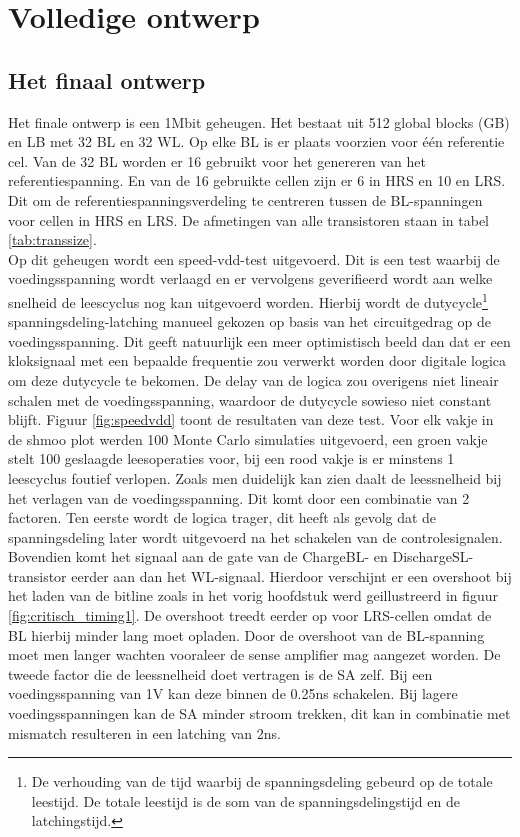 \chapter{Volledige ontwerp}
\label{final}
\section{Het finaal ontwerp}
Het finale ontwerp is een 1Mbit geheugen. Het bestaat uit 512 global blocks (GB) en LB met 32 BL en 32 WL. Op elke BL is er plaats voorzien voor één referentie cel. Van de 32 BL worden er 16 gebruikt voor het genereren van het referentiespanning. En van de 16 gebruikte cellen zijn er 6 in HRS en 10 en LRS. Dit om de referentiespanningsverdeling te centreren tussen de BL-spanningen voor cellen in HRS en LRS. De afmetingen van alle transistoren staan in tabel \ref{tab:transsize}. \\
Op dit geheugen wordt een speed-vdd-test uitgevoerd. Dit is een test waarbij de voedingsspanning wordt verlaagd en er vervolgens geverifieerd wordt aan welke snelheid de leescyclus nog kan uitgevoerd worden. Hierbij wordt de dutycycle\footnote{De verhouding van de tijd waarbij de spanningsdeling gebeurd op de totale leestijd. De totale leestijd is de som van de spanningsdelingstijd en de latchingstijd.} spanningsdeling-latching manueel gekozen op basis van het circuitgedrag op de voedingsspanning. Dit geeft natuurlijk een meer optimistisch beeld dan dat er een kloksignaal met een bepaalde frequentie zou verwerkt worden door digitale logica om deze dutycycle te bekomen. De delay van de logica zou overigens niet lineair schalen met de voedingsspanning, waardoor de dutycycle sowieso niet constant blijft. Figuur \ref{fig:speedvdd} toont de resultaten van deze test. Voor elk vakje in de shmoo plot werden 100 Monte Carlo simulaties uitgevoerd, een groen vakje stelt 100 geslaagde leesoperaties voor, bij een rood vakje is er minstens 1 leescyclus foutief verlopen. Zoals men duidelijk kan zien  daalt de leessnelheid bij het verlagen van de voedingsspanning. Dit komt door een combinatie van 2 factoren. Ten eerste wordt de logica trager, dit heeft als gevolg dat de spanningsdeling later wordt uitgevoerd na het schakelen van de controlesignalen. Bovendien komt het signaal aan de gate van de ChargeBL- en DischargeSL-transistor eerder aan dan het WL-signaal. Hierdoor verschijnt er een overshoot bij het laden van de bitline zoals in het vorig hoofdstuk werd geillustreerd in figuur \ref{fig:critisch_timing1}. De overshoot treedt eerder op voor LRS-cellen omdat de BL hierbij minder lang moet opladen. Door de overshoot van de BL-spanning moet men langer wachten vooraleer de sense amplifier mag aangezet worden. De tweede factor die de leessnelheid doet vertragen is de SA zelf. Bij een voedingsspanning van 1V kan deze binnen de 0.25ns schakelen. Bij lagere voedingsspanningen kan de SA minder stroom trekken, dit kan in combinatie met mismatch resulteren in een latching van 2ns.


